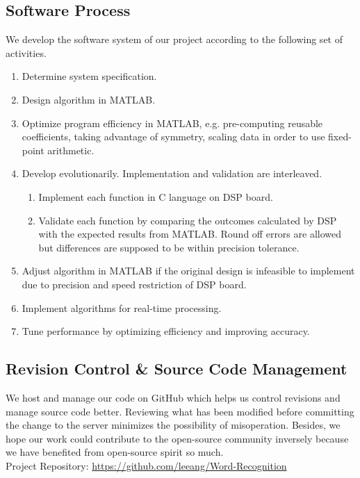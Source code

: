 \subsection{Software Process}
We develop the software system of our project according to the following set of activities.
\begin{enumerate}
\item Determine system specification.
\item Design algorithm in MATLAB.
\item Optimize program efficiency in MATLAB, e.g. pre-computing reusable coefficients, taking advantage of symmetry, scaling data in order to use fixed-point arithmetic.
\item Develop evolutionarily. Implementation and validation are interleaved.
\begin{enumerate}
	\item Implement each function in C language on DSP board.
	\item Validate each function by comparing the outcomes calculated by DSP with the expected results from MATLAB. Round off errors are allowed but differences are supposed to be within precision tolerance.
\end{enumerate}
\item Adjust algorithm in MATLAB if the original design is infeasible to implement due to precision and speed restriction of DSP board.
\item Implement algorithms for real-time processing.
\item Tune performance by optimizing efficiency and improving accuracy.
\end{enumerate}


\subsection{Revision Control \& Source Code Management}

We host and manage our code on GitHub which helps us control revisions and manage source code better. Reviewing what has been modified before committing the change to the server minimizes the possibility of misoperation. Besides, we hope our work could contribute to the open-source community inversely because we have benefited from open-source spirit so much.\\

Project Repository: \url{https://github.com/leeang/Word-Recognition}

